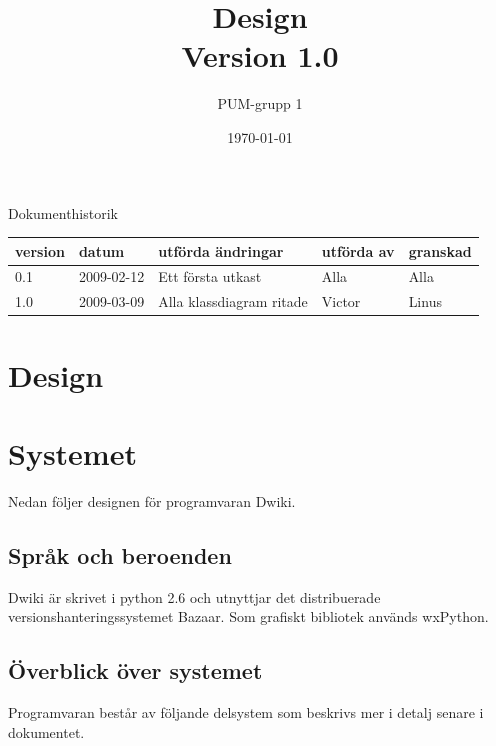 

\ifpdf
\else
\fi

\title{Design \\ Version 1.0}
\author{PUM-grupp 1}
\date{\today}



\maketitle

\thispagestyle{empty}

\newpage

{\centering \Large{Dokumenthistorik\\}}

\vspace{10pt}
\begin{tabularx}{\textwidth}{ |l|l|X|l|l| }
  \hline
    \textbf{version} & \textbf{datum} & \textbf{utförda ändringar} & \textbf{utförda av} & \textbf{granskad} \\
	\hline 
  0.1 & 2009-02-12 &  Ett första utkast  & Alla & Alla   \\
	\hline	
  1.0 & 2009-03-09 & Alla klassdiagram ritade & Victor & Linus\\

  \hline
\end{tabularx}

\newpage

\setcounter{tocdepth}{3}
\tableofcontents
\newpage

\section{Design}

\section{Systemet}
Nedan följer designen för programvaran Dwiki.
\subsection{Språk och beroenden}
Dwiki är skrivet i python 2.6 och utnyttjar det distribuerade versionshanteringssystemet Bazaar. Som grafiskt bibliotek används wxPython.
\subsection{Överblick över systemet}
Programvaran består av följande delsystem som beskrivs mer i detalj senare i dokumentet.
